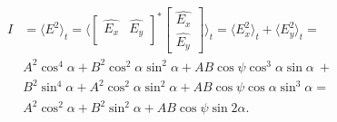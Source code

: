 \documentclass[12pt]{article}
\begin{document}
\begin{equation}
\begin{split}
I &= \langle E^2 \rangle_t  = \bigg \langle \begin{bmatrix}\hat{E_x} & \hat{E_y}\\ \end{bmatrix}^* \begin{bmatrix}\hat{E_x}\\ \hat{E_y} \end{bmatrix} \bigg\rangle_t =  \langle E_x^2 \rangle_t + \langle E_y^2 \rangle_t =\\ &A^2 \cos^4 \alpha + B^2 \cos^2 \alpha \sin^2 \alpha + AB \cos \psi \cos^3 \alpha \sin \alpha~+ \\ &B^2 \sin^4 \alpha + A^2 \cos^2 \alpha \sin^2 \alpha + AB \cos \psi  \cos \alpha \sin^3 \alpha = \\
   & A^2 \cos^2 \alpha + B^2 \sin^2 \alpha + AB \cos \psi \sin 2 \alpha.  
\end{split}
\label{I2angle}
\end{equation}
\end{document}
